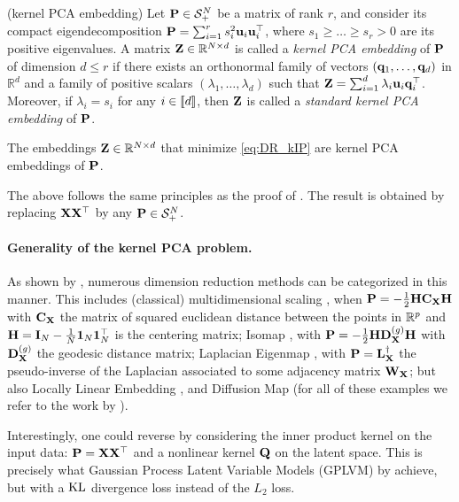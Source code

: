 \begin{definition}{(kernel PCA embedding)}
    Let ${\mathbf{P}} \in \mathcal{S}^N_{+}$ be a matrix of rank $r$, and consider its compact eigendecomposition ${\mathbf{P}} = \sum_{i=1}^{r} s_i^2 {\mathbf{u}}_i {\mathbf{u}}_i^\top$, where $s_1 \geq \dots \geq s_r > 0$ are its positive eigenvalues. A matrix ${\mathbf{Z}} \in \mathbb{R}^{N \times d}$ is called a \emph{kernel PCA embedding} of ${\mathbf{P}}$ of dimension $d \leq r$ if there exists an orthonormal family of vectors $({\mathbf{q}}_1, \dots, {\mathbf{q}}_d)$ in $\mathbb{R}^d$ and a family of positive scalars $(\lambda_1, \dots, \lambda_d)$ such that ${\mathbf{Z}} = \sum_{i=1}^{d} \lambda_i {\mathbf{u}}_i {\mathbf{q}}_i^\top$. Moreover, if $\lambda_i = s_i$ for any $i \in {[\![d]\!]}$, then ${\mathbf{Z}}$ is called a \emph{standard kernel PCA embedding} of ${\mathbf{P}}$.
\end{definition}

\begin{proposition}\label{prop:kernel_PCA_embedding}
    The embeddings ${\mathbf{Z}} \in \mathbb{R}^{N \times d}$ that minimize \ref{eq:DR_kIP} are kernel PCA embeddings of ${\mathbf{P}}$.
\end{proposition}

The above  follows the same principles as the proof of . The result is obtained by replacing ${\mathbf{X}} {\mathbf{X}}^\top$ by any ${\mathbf{P}} \in \mathcal{S}^N_{+}$.

\paragraph{Generality of the kernel PCA problem.}
As shown by \citet{ham2004kernel, ghojogh2021unified}, numerous dimension reduction methods can be categorized in this manner.
This includes 
(classical) multidimensional scaling \citep{borg2005modern}, when ${\mathbf{P}} = -\frac{1}{2} {\mathbf{H}} {\mathbf{C}}_{\mathbf{X}} {\mathbf{H}}$ with ${\mathbf{C}}_{\mathbf{X}}$ the matrix of squared euclidean distance between the points in $\mathbb{R}^{p}$ and ${\mathbf{H}} = {\mathbf{I}}_N - \frac{1}{N} \bm{1}_N \bm{1}_N^\top$ is the centering matrix; Isomap \citep{tenenbaum2000global}, with ${\mathbf{P}} = -\frac{1}{2} {\mathbf{H}} {\mathbf{D}}_{\mathbf{X}}^{(g)} {\mathbf{H}}$ with ${\mathbf{D}}_{\mathbf{X}}^{(g)}$ the geodesic distance matrix; Laplacian Eigenmap
\citep{belkin2003laplacian}, with ${\mathbf{P}} = {\mathbf{L}}_{\mathbf{X}}^{\dagger}$ the pseudo-inverse of the Laplacian associated to some adjacency matrix ${\mathbf{W}}_{\mathbf{X}}$; but also Locally Linear Embedding \citep{roweis2000nonlinear}, and Diffusion Map \citep{coifman2006diffusion} (for all of these examples we refer to the work by \citealt[Table 1]{ghojogh2021unified}).


\begin{remark}
    Interestingly, one could reverse  by considering the inner product kernel on the input data: ${\mathbf{P}} = {\mathbf{X}} {\mathbf{X}}^\top$ and a nonlinear kernel ${\mathbf{Q}}$ on the latent space. This is precisely what Gaussian Process Latent Variable Models (GPLVM) by \cite{lawrence2005probabilistic} achieve, but with a $\operatorname{KL}$ divergence loss instead of the $L_2$ loss.
\end{remark}
